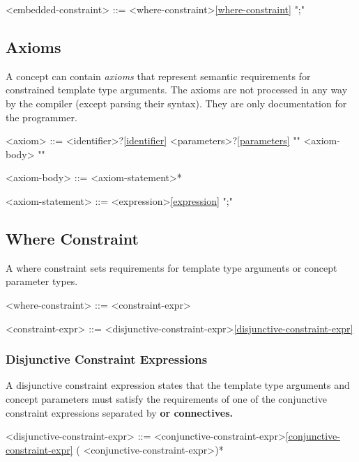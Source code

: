\documentclass[a4paper,oneside,11pt]{article}
\begin{document}
\begin{grammar}
\label{embedded-constraint}<embedded-constraint> ::= <where-constraint>\ref{where-constraint} ";"
\end{grammar}

\subsection{Axioms}

A concept can contain \emph{axioms} that represent semantic requirements for constrained template type arguments.
The axioms are not processed in any way by the compiler (except parsing their syntax).
They are only documentation for the programmer.

\begin{grammar}
\label{axiom}<axiom> ::=  <identifier>?\ref{identifier} <parameters>?\ref{parameters} "{" <axiom-body> "}"

<axiom-body> ::= <axiom-statement>*

<axiom-statement> ::= <expression>\ref{expression} ";"
\end{grammar}

\subsection{Where Constraint}\label{sec:where-constraint}

A where constraint sets requirements for template type arguments or concept parameter types.

\begin{grammar}
\label{where-constraint}<where-constraint> ::=  <constraint-expr>

\label{constraint-expr}<constraint-expr> ::= <disjunctive-constraint-expr>\ref{disjunctive-constraint-expr}
\end{grammar}

\subsubsection{Disjunctive Constraint Expressions}

A disjunctive constraint expression states that the template type arguments and concept parameters must satisfy
the requirements of one of the conjunctive constraint expressions separated by \bf{or} connectives.

\begin{grammar}
\label{disjunctive-constraint-expr}<disjunctive-constraint-expr> ::= <conjunctive-constraint-expr>\ref{conjunctive-constraint-expr} ( <conjunctive-constraint-expr>)*
\end{grammar}
\end{document}
